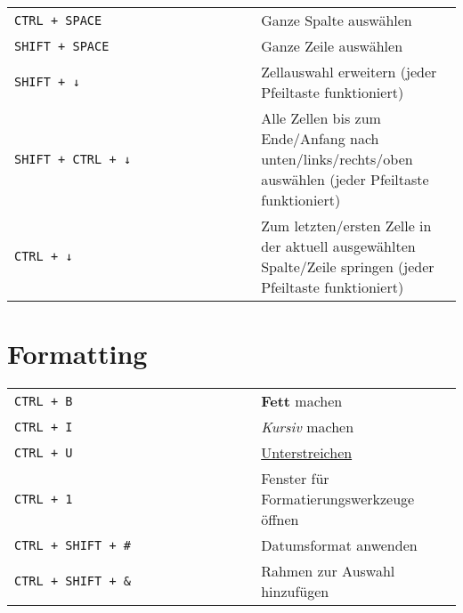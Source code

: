 \documentclass[8pt]{extarticle} %
\begin{document}
\begin{multicols}{2}
  \begin{tabular}{L{0.55\linewidth} L{0.45\linewidth}}

    \tt CTRL + SPACE            & Ganze Spalte auswählen \\
    \tt SHIFT + SPACE           & Ganze Zeile auswählen \\
    \tt SHIFT + ↓               & Zellauswahl erweitern (jeder Pfeiltaste funktioniert) \\
    \tt SHIFT + CTRL + ↓        & Alle Zellen bis zum Ende/Anfang nach unten/links/rechts/oben auswählen (jeder Pfeiltaste funktioniert) \\
    \tt CTRL + ↓                & Zum letzten/ersten Zelle in der aktuell ausgewählten Spalte/Zeile springen (jeder Pfeiltaste funktioniert) \\

  \end{tabular}


\section{Formatting}

  \begin{tabular}{L{0.55\linewidth} L{0.45\linewidth}}
    
    \tt CTRL + B                & \textbf{Fett} machen \\
    \tt CTRL + I                & \textit{Kursiv} machen \\
    \tt CTRL + U                & \underline{Unterstreichen} \\
    \tt CTRL + 1                & Fenster für Formatierungswerkzeuge öffnen \\
    \tt CTRL + SHIFT + \#       & Datumsformat anwenden \\
    \tt CTRL + SHIFT + \&       & Rahmen zur Auswahl hinzufügen \\
    
  \end{tabular}


\end{multicols}
\end{document}
